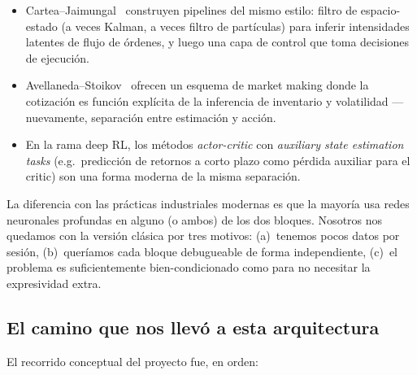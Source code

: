 \documentclass[journal,onecolumn,11pt]{IEEEtran}
\begin{document}
\begin{itemize}
\item Cartea--Jaimungal~\cite{cartea2015} construyen pipelines del
      mismo estilo: filtro de espacio-estado (a veces Kalman, a veces
      filtro de partículas) para inferir intensidades latentes de
      flujo de órdenes, y luego una capa de control que toma
      decisiones de ejecución.
\item Avellaneda--Stoikov~\cite{avellaneda2008} ofrecen un esquema
      de market making donde la cotización es función explícita de
      la inferencia de inventario y volatilidad --- nuevamente,
      separación entre estimación y acción.
\item En la rama deep RL, los métodos \emph{actor-critic} con
      \emph{auxiliary state estimation tasks} (e.g.\ predicción de
      retornos a corto plazo como pérdida auxiliar para el critic)
      son una forma moderna de la misma separación.
\end{itemize}

\noindent
La diferencia con las prácticas industriales modernas es que la
mayoría usa redes neuronales profundas en alguno (o ambos) de los dos
bloques. Nosotros nos quedamos con la versión clásica por
tres motivos: (a)~tenemos pocos datos por sesión, (b)~queríamos cada
bloque debugueable de forma independiente, (c)~el problema es
suficientemente bien-condicionado como para no necesitar la
expresividad extra.

\subsection{El camino que nos llevó a esta arquitectura}

El recorrido conceptual del proyecto fue, en orden:
\end{document}
